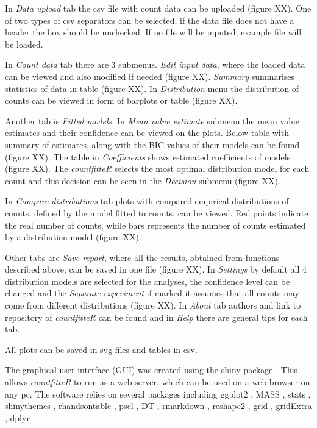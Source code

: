 In \textit{Data upload} tab the csv file with count data can be uploaded (figure XX). One of two types of csv separators can be selected, if the data file does not have a header the box should be unchecked. If no file will be inputed, example file will be loaded.

In \textit{Count data} tab there are 3 submenus. \textit{Edit input data}, where the loaded data can be viewed and also modified if needed (figure XX). \textit{Summary} summarises statistics of data in table (figure XX). In \textit{Distribution} menu the distribution of counts can be viewed in form of barplots or table (figure XX).

Another tab is \textit{Fitted models}. In \textit{Mean value estimate} submenu the mean value estimates and their confidence can be viewed on the plots. Below table with summary of estimates, along with the BIC values of their models can be found (figure XX). The table in \textit{Coefficients} shows estimated coefficients of models (figure XX). The \emph{countfitteR} selects the most optimal distribution model for each count and this decision can be seen in the \textit{Decision} submenu (figure XX).

In \textit{Compare distributions} tab plots with compared empirical distributions of counts, defined by the model fitted to counts, can be viewed. Red points indicate the real number of counts, while bars represents the number of counts estimated by a distribution model (figure XX).

Other tabs are \textit{Save report}, where all the results, obtained from functions described above, can be saved in one file (figure XX). In \textit{Settings} by default all 4 distribution models are selected for the analyses, the confidence level can be changed and the \textit{Separate experiment} if marked it assumes that all counts may come from different distributions (figure XX). In \textit{About} tab authors and link to repository of \emph{countfitteR} can be found and in \textit{Help} there are general tips for each tab. 

All plots can be saved in svg files and tables in csv.

The graphical user interface  (GUI) was created using  the shiny package \citep{shiny}. This allows \emph{countfitteR} to run as a web server, which can be used on a web browser on any pc. The software relies on several packages including ggplot2 \citep{ggplot2}, MASS \citep{MASS}, stats \citep{Rrr}, shinythemes \citep{shinythemes}, rhandsontable \citep{rhandsontable}, pscl \citep{pscl}, DT \citep{DT}, rmarkdown \citep{rmarkdown}, reshape2 \citep{reshape2}, grid \citep{Rrr}, gridExtra \citep{gridextra}, dplyr  \citep{dplyr}.

